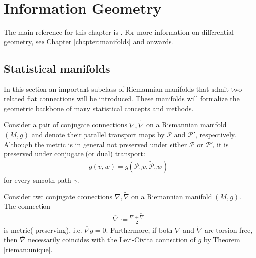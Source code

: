 \chapter{Information Geometry}\label{chapter:info}

    The main reference for this chapter is \cite{amari}. For more information on differential geometry, see Chapter \ref{chapter:manifolds} and onwards.

\section{Statistical manifolds}

    In this section an important subclass of Riemannian manifolds that admit two related flat connections will be introduced. These manifolds will formalize the geometric backbone of many statistical concepts and methods.

    \begin{property}
        Consider a pair of conjugate connections $\nabla,\widetilde{\nabla}$ on a Riemannian manifold $(M,g)$ and denote their parallel transport maps by $\mathcal{P}$ and $\mathcal{P'}$, respectively. Although the metric is in general not preserved under either $\mathcal{P}$ or $\mathcal{P}'$, it is preserved under conjugate (or dual) transport:
        \begin{gather}
            g(v,w) = g\left(\mathcal{P}_\gamma v,\widetilde{\mathcal{P}}_\gamma w\right)
        \end{gather}
        for every smooth path $\gamma$.
    \end{property}

    \begin{property}
        Consider two conjugate connections $\nabla,\widetilde{\nabla}$ on a Riemannian manifold $(M,g)$. The connection
        \begin{gather}
            \overline{\nabla} := \frac{\nabla+\widetilde{\nabla}}{2}
        \end{gather}
        is metric(-preserving), i.e. $\overline{\nabla}g=0$. Furthermore, if both $\nabla$ and $\widetilde{\nabla}$ are torsion-free, then $\overline{\nabla}$ necessarily coincides with the Levi-Civita connection of $g$ by Theorem \ref{rieman:unique}.
    \end{property}


